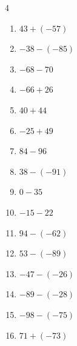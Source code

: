 \begin{multicols}{4}
\begin{enumerate}
        \phantom{$=74$}

  \item $43+(-57)$

        \phantom{$=-14$}

  \item $-38-(-85)$

        \phantom{$=47$}

  \item $-68-70$

        \phantom{$=-138$}

  \item $-66+26$

        \phantom{$=-40$}

  \item $40+44$

        \phantom{$=84$}

  \item $-25+49$

        \phantom{$=24$}

  \item $84-96$

        \phantom{$=-12$}

  \item $38-(-91)$

        \phantom{$=129$}

  \item $0-35$

        \phantom{$=-35$}

  \item $-15-22$

        \phantom{$=-37$}

  \item $94-(-62)$

        \phantom{$=156$}

  \item $53-(-89)$

        \phantom{$=142$}

  \item $-47-(-26)$

        \phantom{$=-21$}

  \item $-89-(-28)$

        \phantom{$=-61$}

  \item $-98-(-75)$

        \phantom{$=-23$}

\columnbreak %

  \item $71+(-73)$


\end{enumerate}
\end{multicols}
